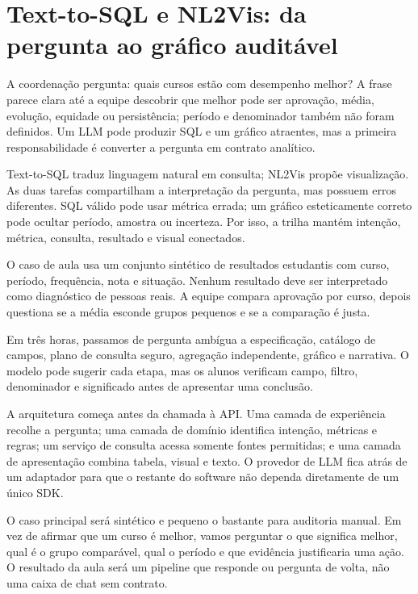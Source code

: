 \chapter{Text-to-SQL e NL2Vis: da pergunta ao gráfico auditável}

A coordenação pergunta: quais cursos estão com desempenho melhor? A frase parece clara até a equipe descobrir que melhor pode ser aprovação, média, evolução, equidade ou persistência; período e denominador também não foram definidos. Um LLM pode produzir SQL e um gráfico atraentes, mas a primeira responsabilidade é converter a pergunta em contrato analítico.

Text-to-SQL traduz linguagem natural em consulta; NL2Vis propõe visualização. As duas tarefas compartilham a interpretação da pergunta, mas possuem erros diferentes. SQL válido pode usar métrica errada; um gráfico esteticamente correto pode ocultar período, amostra ou incerteza. Por isso, a trilha mantém intenção, métrica, consulta, resultado e visual conectados.

O caso de aula usa um conjunto sintético de resultados estudantis com curso, período, frequência, nota e situação. Nenhum resultado deve ser interpretado como diagnóstico de pessoas reais. A equipe compara aprovação por curso, depois questiona se a média esconde grupos pequenos e se a comparação é justa.

Em três horas, passamos de pergunta ambígua a especificação, catálogo de campos, plano de consulta seguro, agregação independente, gráfico e narrativa. O modelo pode sugerir cada etapa, mas os alunos verificam campo, filtro, denominador e significado antes de apresentar uma conclusão.

A arquitetura começa antes da chamada à API. Uma camada de experiência recolhe a pergunta; uma camada de domínio identifica intenção, métricas e regras; um serviço de consulta acessa somente fontes permitidas; e uma camada de apresentação combina tabela, visual e texto. O provedor de LLM fica atrás de um adaptador para que o restante do software não dependa diretamente de um único SDK.

O caso principal será sintético e pequeno o bastante para auditoria manual. Em vez de afirmar que um curso é melhor, vamos perguntar o que significa melhor, qual é o grupo comparável, qual o período e que evidência justificaria uma ação. O resultado da aula será um pipeline que responde ou pergunta de volta, não uma caixa de chat sem contrato.

